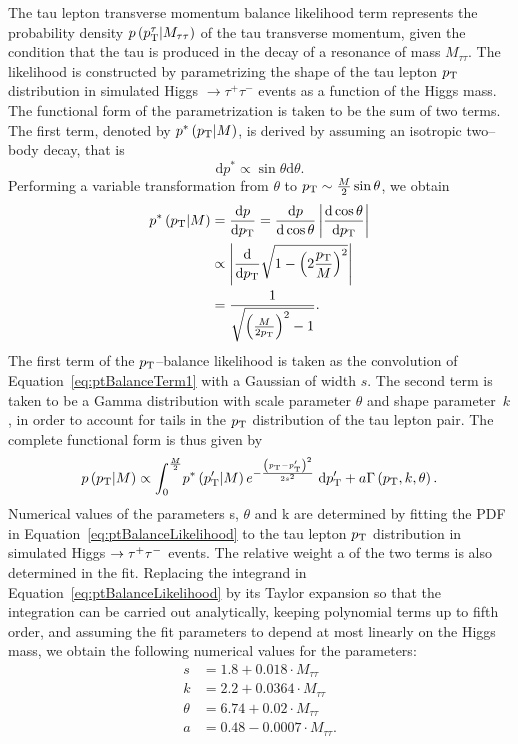 The tau lepton transverse momentum balance likelihood term represents the
probability density $p \left( p_{\mathrm{T}}^{\tau} | M_{\tau\tau} \right)$ of the tau transverse
momentum, given the condition that the tau is produced in the decay of a resonance of
mass $M_{\tau\tau}$.  The likelihood is constructed by parametrizing the shape
of the tau lepton $p_{\mathrm{T}}$ distribution in simulated Higgs $\to \tau^{+}
\tau^{-}$ events as a function of the Higgs mass.  The functional form of the
parametrization is taken to be the sum of two terms.  The first term, denoted by
$p^{*} \left( p_{\mathrm{T}} | M \right)$, is derived by assuming an isotropic two--body
decay, that is
\begin{equation*}
\mathrm{d}p^{*} \propto \sin\theta \mathrm{d}\theta.
\end{equation*}
Performing a variable transformation from $\theta$ to $p_{\mathrm{T}} \sim \frac{M}{2}
\sin\theta$, we obtain
\begin{align}
p^{*} \left( p_{\mathrm{T}} | M \right) &= \frac{\mathrm{d}p}{\mathrm{d}p_{\mathrm{T}}} = \frac{\mathrm{d}p}{\mathrm{d}\cos\theta}
\left| \frac{\mathrm{d}\cos\theta}{\mathrm{d}p_{\mathrm{T}}} \right| \nonumber \\
&\propto \left| \frac{\mathrm{d}}{\mathrm{d}p_{\mathrm{T}}} \sqrt{1 - \left(2 \frac{p_{\mathrm{T}}}{M} \right)^2} \right| \nonumber \\
&= \frac{1}{\sqrt{\left( \frac{M}{2 p_{\mathrm{T}}} \right)^2 - 1}}. 
\label{eq:ptBalanceTerm1}
\end{align}
The first term of the $p_{\mathrm{T}}$--balance likelihood is taken as the convolution of
Equation~\ref{eq:ptBalanceTerm1} with a Gaussian of width $s$.  The second term
is taken to be a Gamma distribution with scale parameter $\theta$ and shape
parameter~$k$, in order to account for tails in the $p_{\mathrm{T}}$ distribution of the
tau lepton pair.  The complete functional form is thus given by
\begin{equation}
p \left( p_{\mathrm{T}} | M \right) \propto \int_0^{\frac{M}{2}} \! p^* \left( p_{\mathrm{T}}' | M \right) 
 e^{-\frac{\left( p_{\mathrm{T}} - p_{\mathrm{T}}' \right)^2}{2 s^2}} \; \mathrm{d}p_{\mathrm{T}}' + a \Gamma \left( p_{\mathrm{T}}, k, \theta \right).
\label{eq:ptBalanceLikelihood}
\end{equation}
Numerical values of the parameters s, $\theta$ and k are determined by fitting
the PDF in Equation~\ref{eq:ptBalanceLikelihood} to the tau lepton $p_{\mathrm{T}}$
distribution in simulated Higgs $\to\tau^+\tau^-$ events.  The relative weight a of the
two terms is also determined in the fit.  Replacing the integrand in
Equation~\ref{eq:ptBalanceLikelihood} by its Taylor expansion so that the
integration can be carried out analytically, keeping polynomial terms up to
fifth order, and assuming the fit parameters to depend at most linearly on the
Higgs mass, we obtain the following numerical values for the parameters:
\begin{align}
s &= 1.8 + 0.018 \cdot M_{\tau\tau} \nonumber \\
k &= 2.2 + 0.0364 \cdot M_{\tau\tau} \nonumber \\
\theta &= 6.74 + 0.02 \cdot M_{\tau\tau} \nonumber \\
a &= 0.48 - 0.0007 \cdot M_{\tau\tau}. \nonumber 
\end{align}

